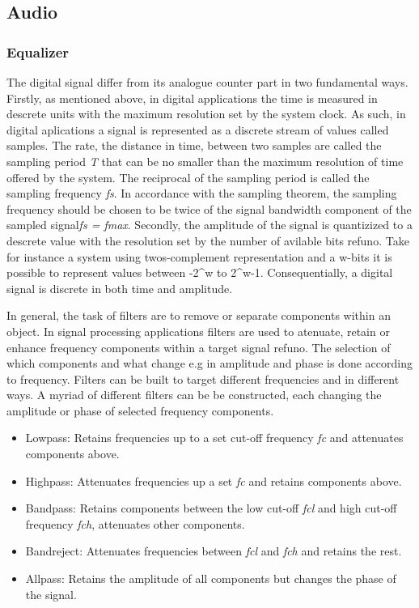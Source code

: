 \documentclass[12p]{article}
\begin{document}
\subsection{Audio}
\label{Theory:Audio}

\subsubsection{Equalizer}

The digital signal differ from its analogue counter part in two fundamental ways. Firstly, as mentioned above, in digital applications the time is measured in descrete units with the maximum resolution set by the system clock. As such, in digital aplications a signal is represented as a discrete stream of values called samples. The rate, the distance in time, between two samples are called the sampling period \emph{T} that can be no smaller than the maximum resolution of time offered by the system. The reciprocal of the sampling period is called the sampling frequency \emph{fs}. In accordance with the sampling theorem, the sampling frequency should be chosen to be twice of the signal bandwidth component of the sampled signal\emph{fs = fmax}.
Secondly, the amplitude of the signal is quantizized to a descrete value with the resolution set by the number of avilable bits ref{uno}. Take for instance a system using twos-complement representation and a w-bits it is possible to represent values between -2^w to 2^w-1. Consequentially, a digital signal is discrete in both time and amplitude.

In general, the task of filters are to remove or separate components within an object. In signal processing applications filters are used to atenuate, retain or enhance frequency components within a target signal ref{uno}. The selection of which components and what change e.g in amplitude and phase is done according to frequency. Filters can be built to target different frequencies and in different ways. A myriad of different filters can be be constructed, each changing the amplitude or phase of selected frequency components.

\begin{itemize}
\item Lowpass: Retains frequencies up to a set cut-off frequency \emph{fc} and attenuates components above.
\item Highpass: Attenuates frequencies up a set \emph{fc} and retains components above.
\item Bandpass: Retains components between the low cut-off \emph{fcl} and high cut-off frequency \emph{fch}, attenuates other components.
\item Bandreject: Attenuates frequencies between \emph{fcl} and \emph{fch} and retains the rest.
\item Allpass: Retains the amplitude of all components but changes the phase of the signal.
\end{itemize}
\end{document}
